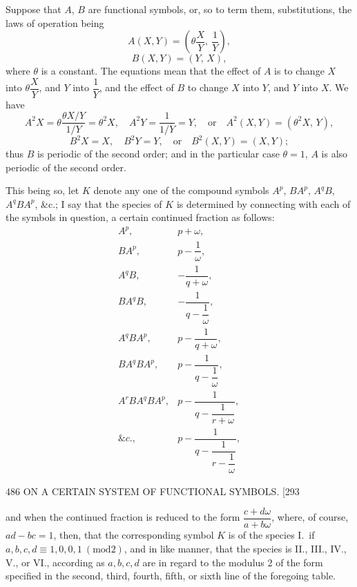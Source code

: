 \documentclass[11pt]{article}
\providecommand{\modd}{\mathrm{mod}}
\begin{document}
Suppose that $A$, $B$ are functional symbols, or, so to term them, substitutions, the
laws of operation being
\[ A(X,Y) = \left(\theta\dfrac{X}{Y},\ \dfrac{1}{Y}\right), \]
\[ B(X,Y) = (Y,\,X), \]
where $\theta$ is a constant. The equations mean that the effect of $A$ is to change $X$
into $\theta\dfrac{X}{Y}$, and $Y$ into $\dfrac{1}{Y}$, and the effect of $B$ to change $X$ into $Y$, and $Y$ into $X$.
We have
\[ A^{2}X = \theta\dfrac{\theta X/Y}{1/Y} = \theta^{2}X,\quad A^{2}Y=\dfrac{1}{1/Y}=Y, \quad\text{or}\quad A^{2}(X,Y)=(\theta^{2}X,\,Y), \]
\[ B^{2}X=X,\quad B^{2}Y=Y,\quad\text{or}\quad B^{2}(X,Y)=(X,Y); \]
thus $B$ is periodic of the second order; and in the particular case $\theta=1$, $A$ is also
periodic of the second order.

This being so, let $K$ denote any one of the compound symbols $A^{p}$, $BA^{p}$, $A^{q}B$,
$A^{q}BA^{p}$, \&c.; I say that the species of $K$ is determined by connecting with each of the
symbols in question, a certain continued fraction as follows:
\[ \begin{array}{ll}
A^{p}, & p+\omega, \\[4pt]
BA^{p}, & p-\dfrac{1}{\omega}, \\[6pt]
A^{q}B, & -\dfrac{1}{q+\omega}, \\[6pt]
BA^{q}B, & -\dfrac{1}{q-\dfrac{1}{\omega}}, \\[10pt]
A^{q}BA^{p}, & p-\dfrac{1}{q+\omega}, \\[10pt]
BA^{q}BA^{p}, & p-\dfrac{1}{q-\dfrac{1}{\omega}}, \\[12pt]
A^{r}BA^{q}BA^{p}, & p-\dfrac{1}{q-\dfrac{1}{r+\omega}}, \\[14pt]
\&c., & p-\dfrac{1}{q-\dfrac{1}{r-\dfrac{1}{\omega}}},
\end{array} \]

\newpage
\begin{center}
486 \hfill ON A CERTAIN SYSTEM OF FUNCTIONAL SYMBOLS. \hfill \textsc{[293}
\end{center}

and when the continued fraction is reduced to the form $\dfrac{c+d\omega}{a+b\omega}$, where, of course,
$ad-bc=1$, then, that the corresponding symbol $K$ is of the species I.\ if
$a,b,c,d\equiv 1,0,0,1\ (\modd 2)$, and in like manner, that the species is II., III., IV.,
V., or VI., according as $a,b,c,d$ are in regard to the modulus 2 of the form specified
in the second, third, fourth, fifth, or sixth line of the foregoing table.
\end{document}
